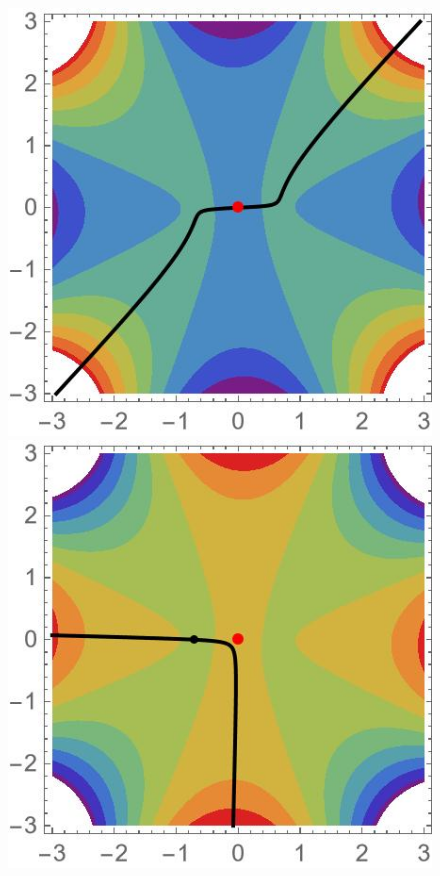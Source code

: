 \documentclass{article}
\theoremstyle{definition}
\begin{document}
\begin{figure}[ht]
    \centering
    \includegraphics[scale=0.4]{figures/contour1-AL4--12.jpg}
    \includegraphics[scale=0.4]{figures/contour2-AL4--12.jpg}

\end{figure}
\end{document}
